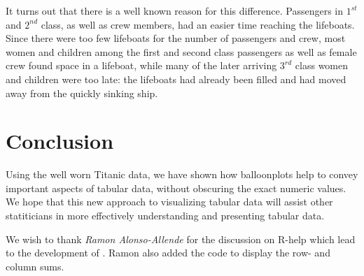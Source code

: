 \documentclass[a4paper]{report}
\begin{document}
\begin{article}
It turns out that there is a well known reason for this difference.
Passengers in $1^{st}$ and $2^{nd}$ class, as well as crew members, had an
easier time reaching the lifeboats.  Since there were too few
lifeboats for the number of passengers and crew, most women and
children among the first and second class passengers as well as
female crew found space in a lifeboat, while many of the later
arriving $3^{rd}$  class women and children were too late: the lifeboats
had already been filled and had moved away from the quickly sinking
ship.

\section*{Conclusion}

Using the well worn Titanic data, we have shown how balloonplots
help to convey important aspects of tabular data, without obscuring
the exact numeric values. We hope that this new approach to
visualizing tabular data will assist other statiticians in more
effectively understanding and presenting tabular data.

We wish to thank \emph{Ramon Alonso-Allende}
 for the discussion on R-help which lead
to the development of . Ramon also added the code
to display the row- and column sums.

\address{Gregory R. Warnes, Pfizer Inc., USA\\
\\
       Nitin Jain, Pfizer Inc., USA\\
}



\end{article}
\end{document}
